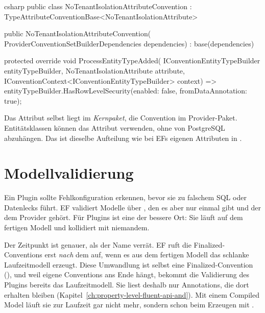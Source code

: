 \begin{sourcecode}{csharp}
public class NoTenantIsolationAttributeConvention
    : TypeAttributeConventionBase<NoTenantIsolationAttribute>
{
    public NoTenantIsolationAttributeConvention(
        ProviderConventionSetBuilderDependencies dependencies)
        : base(dependencies)
    {
    }

    protected override void ProcessEntityTypeAdded(
        IConventionEntityTypeBuilder entityTypeBuilder,
        NoTenantIsolationAttribute attribute,
        IConventionContext<IConventionEntityTypeBuilder> context)
        => entityTypeBuilder.HasRowLevelSecurity(enabled: false, fromDataAnnotation: true);
}
\end{sourcecode}

\begin{tip}
  Das Attribut selbst liegt im \emph{Kernpaket}, die Convention im Provider-Paket.
  Entitätsklassen können das Attribut verwenden, ohne von PostgreSQL abzuhängen. Das ist
  dieselbe Aufteilung wie bei EFs eigenen Attributen in
  .
\end{tip}

\chapter{Modellvalidierung}\label{ch:model-validation}

Ein Plugin sollte Fehlkonfiguration erkennen, bevor sie zu falschem SQL oder Datenlecks
führt. EF validiert Modelle über , den es aber nur einmal
gibt und der dem Provider gehört. Für Plugins ist eine
 der bessere Ort: Sie läuft auf
dem fertigen Modell und kollidiert mit niemandem.

Der Zeitpunkt ist genauer, als der Name verrät. EF ruft die Finalized-Conventions erst
\emph{nach} dem  auf, wenn es aus dem fertigen Modell das
schlanke Laufzeitmodell erzeugt. Diese Umwandlung ist selbst eine Finalized-Convention
(), und weil
 eigene Conventions ans Ende hängt, bekommt
die Validierung des Plugins bereits das Laufzeitmodell. Sie liest deshalb nur Annotations,
die dort erhalten bleiben (Kapitel~\ref{ch:property-level-fluent-api-and}). Mit einem
Compiled Model läuft sie zur Laufzeit gar nicht mehr, sondern schon beim Erzeugen mit
.

